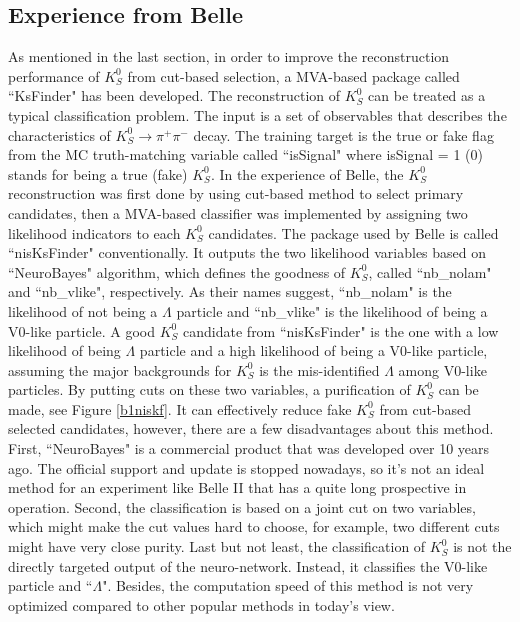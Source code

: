 \subsection{Experience from Belle}
As mentioned in the last section, in order to improve the reconstruction performance of $K_S^0$ from cut-based selection, a MVA-based package called ``KsFinder" has been developed. The reconstruction of $K_S^0$ can be treated as a typical classification problem. The input is a set of observables that describes the characteristics of $K_S^0 \to \pi^+ \pi^-$ decay. The training  target is the true or fake flag from the MC truth-matching variable called ``isSignal" where isSignal = 1 (0) stands for being a true (fake) $K_S^0$. In the experience of Belle, the $K_S^0$ reconstruction was first done by using cut-based method to select primary candidates, then a MVA-based classifier was implemented by assigning two likelihood indicators to each $K_S^0$ candidates. The package used by Belle is called ``nisKsFinder"\cite{b2book} conventionally. It outputs the two likelihood variables based on ``NeuroBayes" algorithm\cite{feindt2006neurobayes}, which defines the goodness of $K_S^0$, called ``nb\_nolam" and ``nb\_vlike", respectively. As their names suggest, ``nb\_nolam" is the likelihood of not being a $\Lambda$ particle and ``nb\_vlike" is the likelihood of being a V0-like particle. A good $K_S^0$ candidate from ``nisKsFinder" is the one with a low likelihood of being $\Lambda$ particle and a high likelihood of being a V0-like particle, assuming the major backgrounds for $K_S^0$ is the mis-identified $\Lambda$ among V0-like particles. By putting cuts on these two variables, a purification of $K_S^0$ can be made, see Figure \ref{b1niskf}. It can effectively reduce fake $K_S^0$ from cut-based selected candidates, however, there are a few disadvantages about this method. First, ``NeuroBayes" is a commercial product that was developed over 10 years ago. The official support and update is stopped nowadays, so it's not an ideal method for an experiment like Belle II that has a quite long prospective in operation. Second, the classification is based on a joint cut on two variables, which might make the cut values hard to choose, for example, two different cuts might have very close purity. Last but not least, the classification of $K_S^0$ is not the directly targeted output of the neuro-network. Instead, it classifies the V0-like particle and ``$\Lambda$". Besides, the computation speed of this method is not very optimized compared to other popular methods in today's view. 

